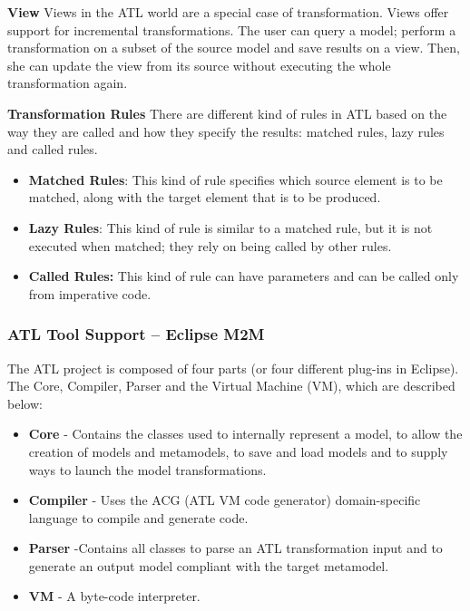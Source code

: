 \textbf{View}
Views in the ATL world are a special case of transformation. Views offer support for incremental transformations. The user can query a model; perform a transformation on a subset of the source model and save results on a view. Then, she can update the view from its source without executing the whole transformation again. 

\textbf{Transformation Rules
}
There are different kind of rules in ATL based on the way they are called and how they specify the results: matched rules, lazy rules and called rules.

\begin{itemize}
\item \textbf{Matched Rules}: 	This kind of rule specifies which source element is to be matched, along with the target element that is to be produced.
\item \textbf{Lazy Rules}: This kind of rule is similar to a matched rule, but it is not executed when matched; they rely on being called by other rules.
\item \textbf{Called Rules:}	This kind of rule can have parameters and can be called only from imperative code.
\end{itemize}

\subsubsection{ATL Tool Support – Eclipse M2M}
The ATL project is composed of four parts (or four different plug-ins in Eclipse). The Core, Compiler, Parser and the Virtual Machine (VM), which are described below:

\begin{itemize}
\item \textbf{Core} - Contains the classes used to internally represent a model, to allow the creation of models and metamodels, to save and load models and to supply ways to launch the model transformations. 
\item \textbf{Compiler} - Uses the ACG (ATL VM code generator) domain-specific language to compile and generate code. 
\item \textbf{Parser} -Contains all classes to parse an ATL transformation input and to generate an output model compliant with the target metamodel.
\item \textbf{VM} - A byte-code interpreter.
\end{itemize}


